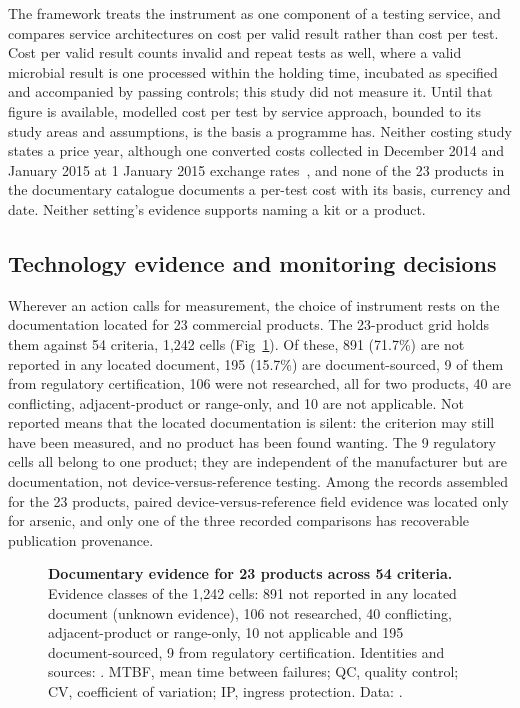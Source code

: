 \documentclass[10pt,letterpaper]{article}
\begin{document}
The framework treats the instrument as one component of a testing service, and compares service architectures on cost per valid result rather than cost per test. Cost per valid result counts invalid and repeat tests as well, where a valid microbial result is one processed within the holding time, incubated as specified and accompanied by passing controls; this study did not measure it. Until that figure is available, modelled cost per test by service approach, bounded to its study areas and assumptions, is the basis a programme has. Neither costing study states a price year, although one converted costs collected in December 2014 and January 2015 at 1 January 2015 exchange rates~\cite{Delaire2017}, and none of the 23 products in the documentary catalogue documents a per-test cost with its basis, currency and date. Neither setting's evidence supports naming a kit or a product.

\subsection*{Technology evidence and monitoring decisions}

Wherever an action calls for measurement, the choice of instrument rests on the documentation located for 23 commercial products. The 23-product grid holds them against 54 criteria, 1,242 cells (Fig~\ref{fig:product-evidence}). Of these, 891 (71.7\%) are not reported in any located document, 195 (15.7\%) are document-sourced, 9 of them from regulatory certification, 106 were not researched, all for two products, 40 are conflicting, adjacent-product or range-only, and 10 are not applicable. Not reported means that the located documentation is silent: the criterion may still have been measured, and no product has been found wanting. The 9 regulatory cells all belong to one product; they are independent of the manufacturer but are documentation, not device-versus-reference testing. Among the records assembled for the 23 products, paired device-versus-reference field evidence was located only for arsenic, and only one of the three recorded comparisons has recoverable publication provenance.\label{callout:fig:product-evidence}

\begin{figure}[!ht]
\caption{\textbf{Documentary evidence for 23 products across 54 criteria.} Evidence classes of the 1,242 cells: 891 not reported in any located document (unknown evidence), 106 not researched, 40 conflicting, adjacent-product or range-only, 10 not applicable and 195 document-sourced, 9 from regulatory certification. Identities and sources: . MTBF, mean time between failures; QC, quality control; CV, coefficient of variation; IP, ingress protection. Data: .}
\label{fig:product-evidence}
\end{figure}
\end{document}
